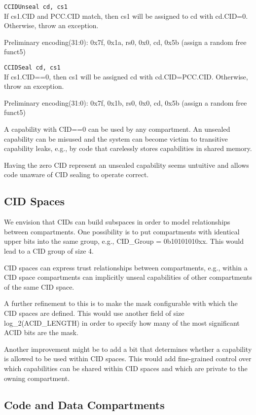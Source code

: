 \texttt{CCIDUnseal cd, cs1}\\
If cs1.CID and PCC.CID match, then cs1 will be assigned to cd with cd.CID=0. Otherwise, throw an exception.

Preliminary encoding(31:0): 0x7f, 0x1a, rs0, 0x0, cd, 0x5b (assign a random free funct5)

\texttt{CCIDSeal cd, cs1}\\
If cs1.CID==0, then cs1 will be assigned cd with cd.CID=PCC.CID. Otherwise, throw an exception.

Preliminary encoding(31:0): 0x7f, 0x1b, rs0, 0x0, cd, 0x5b (assign a random free funct5)

A capability with CID==0 can be used by any compartment.
An unsealed capability can be misused and the system can become victim to transitive capability leaks, e.g., by code that carelessly stores capabilities in shared memory.

Having the zero CID represent an unsealed capability seems untuitive and allows code unaware of CID sealing to operate correct.

\subsection{CID Spaces}

We envision that CIDs can build subspaces in order to model relationships between compartments.
One possibility is to put compartments with identical upper bits into the same group, e.g., CID\_Group = 0b10101010xx.
This would lead to a CID group of size 4.

CID spaces can express trust relationships between compartments, e.g., within a CID space compartments can implicitly unseal capabilities of other compartments of the same CID space.

A further refinement to this is to make the mask configurable with which the CID spaces are defined.
This would use another field of size log\_2(ACID\_LENGTH) in order to specify how many of the most significant ACID bits are the mask.

Another improvement might be to add a bit that determines whether a capability is allowed to be used within CID spaces.
This would add fine-grained control over which capabilities can be shared within CID spaces and which are private to the owning compartment.

\subsection{Code and Data Compartments}

